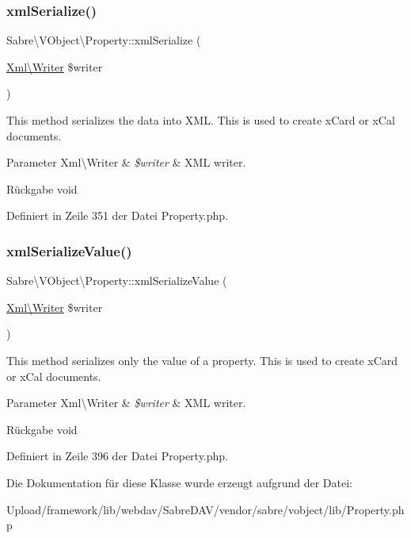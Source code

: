 \subsubsection{\texorpdfstring{xml\+Serialize()}{xmlSerialize()}}
{\footnotesize\ttfamily Sabre\textbackslash{}\+V\+Object\textbackslash{}\+Property\+::xml\+Serialize (\begin{DoxyParamCaption}\item[{\mbox{\hyperlink{class_sabre_1_1_xml_1_1_writer}{Xml\textbackslash{}\+Writer}}}]{\$writer }\end{DoxyParamCaption})}

This method serializes the data into X\+ML. This is used to create x\+Card or x\+Cal documents.


\begin{DoxyParams}[1]{Parameter}
Xml\textbackslash{}\+Writer & {\em \$writer} & X\+ML writer.\\
\hline
\end{DoxyParams}
\begin{DoxyReturn}{Rückgabe}
void 
\end{DoxyReturn}


Definiert in Zeile 351 der Datei Property.\+php.

\mbox{\label{class_sabre_1_1_v_object_1_1_property_a1f8599ce6c6362ddf5f037a187d2b15c}} 
\subsubsection{\texorpdfstring{xml\+Serialize\+Value()}{xmlSerializeValue()}}
{\footnotesize\ttfamily Sabre\textbackslash{}\+V\+Object\textbackslash{}\+Property\+::xml\+Serialize\+Value (\begin{DoxyParamCaption}\item[{\mbox{\hyperlink{class_sabre_1_1_xml_1_1_writer}{Xml\textbackslash{}\+Writer}}}]{\$writer }\end{DoxyParamCaption})\hspace{0.3cm}{\ttfamily [protected]}}

This method serializes only the value of a property. This is used to create x\+Card or x\+Cal documents.


\begin{DoxyParams}[1]{Parameter}
Xml\textbackslash{}\+Writer & {\em \$writer} & X\+ML writer.\\
\hline
\end{DoxyParams}
\begin{DoxyReturn}{Rückgabe}
void 
\end{DoxyReturn}


Definiert in Zeile 396 der Datei Property.\+php.



Die Dokumentation für diese Klasse wurde erzeugt aufgrund der Datei\+:\begin{DoxyCompactItemize}
\item 
Upload/framework/lib/webdav/\+Sabre\+D\+A\+V/vendor/sabre/vobject/lib/Property.\+php\end{DoxyCompactItemize}
